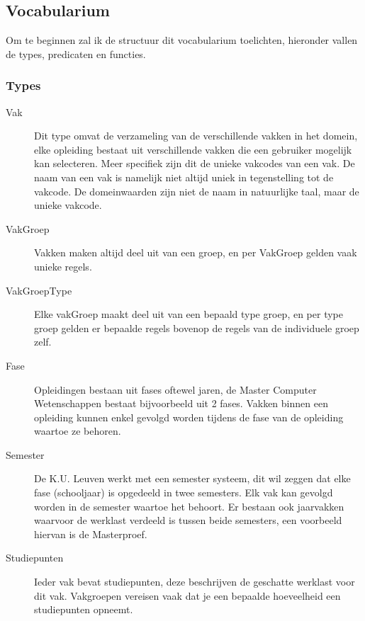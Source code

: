 \subsection{Vocabularium}
Om te beginnen zal ik de structuur dit vocabularium toelichten, hieronder vallen de types, predicaten en functies.
\subsubsection{Types}
\begin{description}
\item [Vak] Dit type omvat de verzameling van de verschillende vakken in het domein, elke opleiding bestaat uit verschillende vakken die een gebruiker mogelijk kan selecteren. Meer specifiek zijn dit de unieke vakcodes van een vak. De naam van een vak is namelijk niet altijd uniek in tegenstelling tot de vakcode. 
De domeinwaarden zijn niet de naam in natuurlijke taal, maar de unieke vakcode.
\item [VakGroep] Vakken maken altijd deel uit van een groep, en per VakGroep gelden vaak unieke regels. 
\item [VakGroepType] Elke vakGroep maakt deel uit van een bepaald type groep, en per type groep gelden er bepaalde regels bovenop de regels van de individuele groep zelf.
\item [Fase] Opleidingen bestaan uit fases oftewel jaren, de Master Computer Wetenschappen bestaat bijvoorbeeld uit 2 fases. Vakken binnen een opleiding kunnen enkel gevolgd worden tijdens de fase van de opleiding waartoe ze behoren. 
\item [Semester] De K.U. Leuven werkt met een semester systeem, dit wil zeggen dat elke fase (schooljaar) is opgedeeld in twee semesters. Elk vak kan gevolgd worden in de semester waartoe het behoort. Er bestaan ook jaarvakken waarvoor de werklast verdeeld is tussen beide semesters, een voorbeeld hiervan is de Masterproef.
\item [Studiepunten] Ieder vak bevat studiepunten, deze beschrijven de geschatte werklast voor dit vak. Vakgroepen vereisen vaak dat je een bepaalde hoeveelheid een studiepunten opneemt. 
\end{description}

